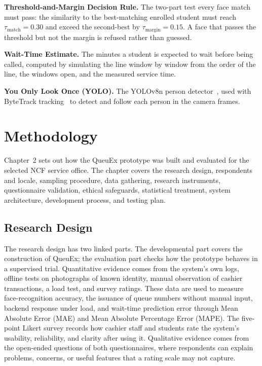 \documentclass{research}
\newcommand{\sysname}{QueuEx}
\begin{document}
\textbf{Threshold-and-Margin Decision Rule.} The two-part test every
face match must pass: the similarity to the best-matching enrolled
student must reach $\tau_{\mathrm{match}} = 0.30$ and exceed the
second-best by $\tau_{\mathrm{margin}} = 0.15$. A face that passes the
threshold but not the margin is refused rather than guessed.

\textbf{Wait-Time Estimate.} The minutes a student is expected to wait
before being called, computed by simulating the line window by window
from the order of the line, the windows open, and the measured service
time.

\textbf{You Only Look Once (YOLO).} The YOLOv8n person
detector~\cite{jocher2023}, used with ByteTrack
tracking~\cite{zhang2022bytetrack} to detect and follow each person in
the camera frames.

\chapter{Methodology}

Chapter~2 sets out how the \sysname{} prototype was built and evaluated
for the selected NCF service office. The chapter covers
the research design, respondents and locale, sampling procedure, data
gathering, research instruments, questionnaire validation, ethical
safeguards, statistical treatment, system architecture, development
process, and testing plan.

\section{Research Design}

The research design has two linked parts. The developmental part covers
the construction of \sysname{}; the evaluation part checks how the
prototype behaves in a supervised trial. Quantitative evidence
comes from the system's own logs, offline tests on photographs of known
identity, manual observation of cashier transactions, a load test, and
survey ratings. These data are used to measure face-recognition
accuracy, the issuance of queue numbers without manual input, backend
response under load, and wait-time prediction error through Mean
Absolute Error (MAE) and Mean Absolute Percentage Error (MAPE). The
five-point Likert survey records how cashier staff and students rate
the system's usability, reliability, and clarity after using it. Qualitative evidence comes from the open-ended questions of both
questionnaires, where respondents can explain problems, concerns, or
useful features that a rating scale may not capture.
\end{document}
